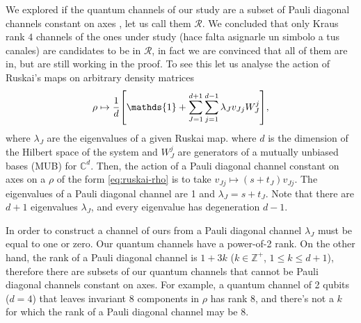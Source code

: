 \documentclass[11pt,dvipsnames]{article} %
\newcommand{\1}{\mathds{1}}
\begin{document}
We explored if the quantum channels of our study are a subset 
of Pauli diagonal channels constant on axes \cite{nathanson2007pauli}, let us call them $\mathcal{R}$.
We concluded that only Kraus rank $4$ channels of the ones under study (hace falta asignarle un simbolo a tus canales) are candidates to be in $\mathcal{R}$, in fact we are convinced that all of them are in, but are still working in the proof. To see this
let us analyse the action of Ruskai's maps on arbitrary density matrices
\begin{align}
	\rho \mapsto \frac{1}{d}\qty[\1 + \sum _{J=1}^{d+1} \sum _{j=1}^{d-1}
	\lambda_J v_{Jj}W_J^j],
	\label{eq:ruskai-rho}
\end{align}
where $\lambda_J$ are the eigenvalues of a given Ruskai map. 
where $d$ is the dimension of the Hilbert space of the system and $W_J^j$ 
are generators of a mutually unbiased bases (MUB) for $\mathbb{C}^{d}$.
Then, the action of a Pauli diagonal channel constant on axes on a 
$\rho$ of the form \eqref{eq:ruskai-rho} is to take 
$v_{Jj}\mapsto (s+t_J)v_{Jj}$. The eigenvalues of a Pauli diagonal channel
are 1 and $\lambda _J=s+t_J$. Note that there are $d+1$ eigenvalues 
$\lambda_J$, and every eigenvalue has degeneration $d-1$. 

In order to construct a channel of ours from a 
Pauli diagonal channel $\lambda_J$ must be equal to one or zero. Our
quantum channels have a power-of-2 rank. On the other hand, 
the rank of a Pauli diagonal channel is $1+3k$ ($k\in \mathbb{Z}^+$,
$1\leq k\leq d+1$),
therefore there are subsets of our quantum channels that cannot be  
Pauli diagonal channels constant on axes. For example, a quantum channel of 2 qubits 
($d=4$) that leaves invariant 8 components in $\rho$ has rank 8, and
there's not a $k$ for which the rank of a Pauli diagonal channel may be 8.



\end{document}
